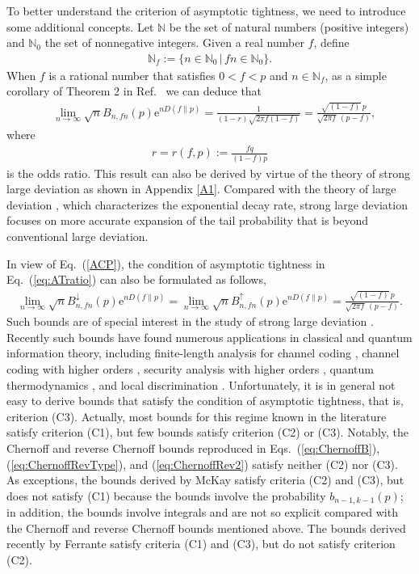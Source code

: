 \documentclass[aop]{imsart}
\theoremstyle{plain}
\theoremstyle{remark}
\newcommand{\rme}{\mathrm{e}}
\newcommand{\bbN}{\mathbb{N}}
\newcommand{\1}{\operatorname{\uppercase\expandafter{\romannumeral1}}}
\newcommand{\2}{\operatorname{\uppercase\expandafter{\romannumeral2}}}
\newcommand{\3}{\operatorname{\uppercase\expandafter{\romannumeral3}}}
\newcommand{\4}{\operatorname{\uppercase\expandafter{\romannumeral4}}}
\newcommand{\5}{\operatorname{\uppercase\expandafter{\romannumeral5}}}
\newcommand{\6}{\operatorname{\uppercase\expandafter{\romannumeral6}}}
\newcommand{\7}{\operatorname{\uppercase\expandafter{\romannumeral7}}}
\newcommand{\8}{\operatorname{\uppercase\expandafter{\romannumeral8}}}
\newcommand{\9}{\operatorname{\uppercase\expandafter{\romannumeral9}}}
\newcommand{\eref}[1]{Eq.~\textup{(\ref{#1})}}
\newcommand{\eqssref}[3]{Eqs.~(\ref{#1}), (\ref{#2}), and (\ref{#3})}
\newcommand{\rcite}[1]{Ref.~\cite{#1}}
\begin{document}
To better understand the criterion of asymptotic tightness, we need to introduce some additional concepts. 
Let $\bbN$ be the set of natural numbers (positive integers) and $\bbN_0$ the set of nonnegative integers. Given a real number $f$, define
\begin{align}
\bbN_f:=\{n\in \bbN_0\,|\,fn\in \bbN_0\}. \label{eq:Nf}
\end{align}
When  $f$ is a rational number that satisfies $0<f<p$ and $n\in \bbN_f$, as a simple corollary of Theorem 2 in \rcite{AG} we can deduce that 
\begin{align}
&\lim_{n \to \infty}\sqrt{n} B_{n,fn}(p) \rme^{nD (f\|p)}
=\frac{1}{(1-r)\sqrt{2\pi  f(1 -f)} }=\frac{\sqrt{(1-f)}\,p}{\sqrt{2\pi f} \,(p -f) },\label{ACP}
\end{align}
where  
\begin{align}
r=r(f,p):=
\frac{f q }{(1-f)p}\label{eq:OddsRatio}
\end{align}
is the odds ratio. 	This result can also be derived by virtue of the theory of  strong large deviation  \cite{BlacH59,BahaR60,DembZ10} as shown in Appendix \ref{A1}.
Compared with the theory of large deviation  \cite{Cram38,Cher52,Vara84book,DembZ10}, which characterizes the exponential decay rate,   strong large deviation focuses on more accurate expansion of the tail probability that is beyond conventional large deviation.




In view of \eref{ACP}, the condition of asymptotic tightness in \eref{eq:ATratio} can also be formulated as follows, 
\begin{align}
\lim_{n \to \infty} \sqrt{n} B_{n,fn}^\downarrow(p) \rme^{nD (f\|p)}
=\lim_{n \to \infty}\sqrt{n} B_{n,fn}^\uparrow (p) \rme^{nD (f\|p)}
=\frac{\sqrt{(1-f)}\,p}{\sqrt{2\pi f}\, (p -f) }.\label{eq:TIGHT}
\end{align}
Such bounds are of special interest in the study of strong large deviation \cite{BlacH59,BahaR60,DembZ10}.  Recently such bounds have found numerous applications in classical and quantum information theory, 
including 
finite-length analysis for channel coding  \cite{Ferr21},
channel coding with higher orders \cite{Moul17,Haya18}, 
security analysis with higher orders \cite{Haya18, Haya19},
quantum thermodynamics \cite{TajiH17,ItoH18}, and local discrimination \cite{HayaO17}.
Unfortunately, it is in general not easy to derive bounds that satisfy the condition of asymptotic tightness, that is, criterion (C3).
Actually,  most bounds  for this regime \cite{Cher52,Hoef63,MacWS77book,Ash92book, JohnKK05,CsisK11,Csis98,WataH17} known in the literature satisfy criterion (C1), but few bounds satisfy criterion (C2) or (C3). Notably,  the Chernoff and reverse Chernoff bounds  reproduced in \eqssref{eq:ChernoffB}{eq:ChernoffRevType}{eq:ChernoffRev2} satisfy neither (C2) nor (C3). 
As exceptions, the bounds derived by McKay \cite{McKa89}  satisfy criteria (C2) and (C3), but does not satisfy (C1)
because the bounds involve the probability $b_{n-1,k-1}(p)$;
in addition, the bounds involve integrals and are not so explicit compared with the Chernoff and reverse Chernoff bounds mentioned above. 
The bounds derived recently by Ferrante \cite{Ferr21} satisfy criteria (C1) and (C3), but do not satisfy criterion (C2). 
\end{document}
